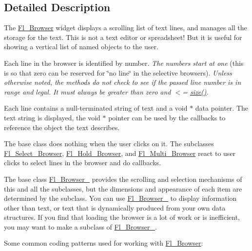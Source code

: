 \subsection{Detailed Description}
The \hyperlink{class_fl___browser}{Fl\+\_\+\+Browser} widget displays a scrolling list of text lines, and manages all the storage for the text. This is not a text editor or spreadsheet! But it is useful for showing a vertical list of named objects to the user.

Each line in the browser is identified by number. {\itshape The numbers start at one} (this is so that zero can be reserved for \char`\"{}no line\char`\"{} in the selective browsers). {\itshape Unless otherwise noted, the methods do not check to see if the passed line number is in range and legal. It must always be greater than zero and $<$= \hyperlink{class_fl___browser_aa091ef8cad532a0ca99797f13d113fec}{size()}.}

Each line contains a null-\/terminated string of text and a void $\ast$ data pointer. The text string is displayed, the void $\ast$ pointer can be used by the callbacks to reference the object the text describes.

The base class does nothing when the user clicks on it. The subclasses \hyperlink{class_fl___select___browser}{Fl\+\_\+\+Select\+\_\+\+Browser}, \hyperlink{class_fl___hold___browser}{Fl\+\_\+\+Hold\+\_\+\+Browser}, and \hyperlink{class_fl___multi___browser}{Fl\+\_\+\+Multi\+\_\+\+Browser} react to user clicks to select lines in the browser and do callbacks.

The base class \hyperlink{class_fl___browser__}{Fl\+\_\+\+Browser\+\_\+} provides the scrolling and selection mechanisms of this and all the subclasses, but the dimensions and appearance of each item are determined by the subclass. You can use \hyperlink{class_fl___browser__}{Fl\+\_\+\+Browser\+\_\+} to display information other than text, or text that is dynamically produced from your own data structures. If you find that loading the browser is a lot of work or is inefficient, you may want to make a subclass of \hyperlink{class_fl___browser__}{Fl\+\_\+\+Browser\+\_\+}.

Some common coding patterns used for working with \hyperlink{class_fl___browser}{Fl\+\_\+\+Browser}\+: 


